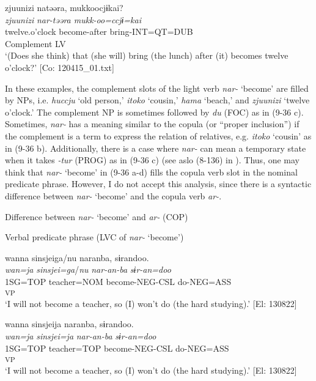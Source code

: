 \ex \label{ex:9.36d} %
    \gllll  {\textbar}zjuunizi{\textbar}  natəəra,  mukkoocjɨkai?\\
      \textit{zjuunizi}  \textit{nar{}-təəra  mukk-oo=ccjɨ=kai}\\
      twelve.o’clock  become-after  bring-INT=QT=DUB\\
      Complement  LV  \\
      \glt       ‘(Does she think) that (she will) bring (the lunch) after (it) becomes twelve o’clock?’ [Co: 120415\_01.txt]
    \z
\z

In these examples, the complement slots of the light verb \textit{nar-} ‘become’ are filled by NPs, i.e. \textit{huccju} ‘old person,’ \textit{itoko} ‘cousin,’ \textit{hama} ‘beach,’ and \textit{zjuunizi} ‘twelve o’clock.’ The complement NP is sometimes followed by \textit{du} (FOC) as in (9-36 c). Sometimes, \textit{nar-} has a meaning similar to the copula (or “proper inclusion”) \citep[114]{Payne1997} if the complement is a term to express the relation of relatives, e.g. \textit{itoko} ‘cousin’ as in (9-36 b). Additionally, there is a case where \textit{nar-} can mean a temporary state when it takes \textit{{}-tur} (PROG) as in (9-36 c) (see aslo (8-136) in ). Thus, one may think that \textit{nar-} ‘become’ in (9-36 a-d) fills the copula verb slot in the nominal predicate phrase. However, I do not accept this analysis, since there is a syntactic difference between \textit{nar-} ‘become’ and the copula verb \textit{ar-}.

\ea   Difference between \textit{nar-} ‘become’ and \textit{ar-} (COP) \label{ex:9.37}

 \exi{} Verbal predicate phrase (LVC of \textit{nar-} ‘become’)

\ea %
 \gllll  *wanna  sinsjeiga/nu  naranba,  sɨrandoo.\\
       \textit{wan=ja}  \textit{sinsjei=ga}/\textit{nu}  \textit{nar-an-ba}  \textit{sɨr-an=doo}\\
       1SG=TOP  teacher=NOM  become-NEG-CSL  do-NEG=ASS\\
        [Complement  LV]\textsubscript{VP}  \\
       ‘I will not become a teacher, so (I) won’t do (the hard studying).’ [El: 130822]

\ex \label{ex:9.37b} %
    \gllll  wanna  sinsjeija  naranba,  sɨrandoo.\\
       \textit{wan=ja}  \textit{sinsjei=ja}  \textit{nar-an-ba}  \textit{sɨr-an=doo}\\
       1SG=TOP  teacher=TOP  become-NEG-CSL  do-NEG=ASS\\
        [Complement  LV]\textsubscript{VP}  \\
      \glt        ‘I will not become a teacher, so (I) won’t do (the hard studying).’ [El: 130822]

